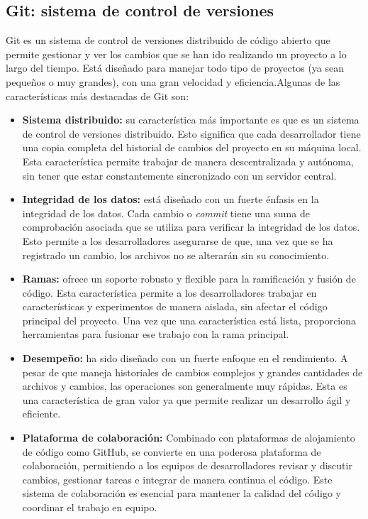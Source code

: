     \subsection{Git: sistema de control de versiones}
    Git \cite{wiki:git} es un sistema de control de versiones distribuido de código abierto que permite gestionar y ver los cambios que se han ido realizando un proyecto a lo largo del tiempo. Está diseñado para manejar todo tipo de proyectos (ya sean pequeños o muy grandes), con una gran velocidad y eficiencia.Algunas de las características más destacadas de Git son:
    \begin{itemize}
        \item \textbf{Sistema distribuido:} su característica más importante es que es un sistema de control de versiones distribuido. Esto significa que cada desarrollador tiene una copia completa del historial de cambios del proyecto en su máquina local. Esta característica permite trabajar de manera descentralizada y autónoma, sin tener que estar constantemente sincronizado con un servidor central.
        \item \textbf{Integridad de los datos:} está diseñado con un fuerte énfasis en la integridad de los datos. Cada cambio o \textit{commit} tiene una suma de comprobación asociada que se utiliza para verificar la integridad de los datos. Esto permite a los desarrolladores asegurarse de que, una vez que se ha registrado un cambio, los archivos no se alterarán sin su conocimiento.
        \item \textbf{Ramas:} ofrece un soporte robusto y flexible para la ramificación y fusión de código. Esta característica permite a los desarrolladores trabajar en características y experimentos de manera aislada, sin afectar el código principal del proyecto. Una vez que una característica está lista, proporciona herramientas para fusionar ese trabajo con la rama principal.
        \item \textbf{Desempeño:} ha sido diseñado con un fuerte enfoque en el rendimiento. A pesar de que maneja historiales de cambios complejos y grandes cantidades de archivos y cambios, las operaciones son generalmente muy rápidas. Esta es una característica de gran valor ya que permite realizar un desarrollo ágil y eficiente.
        \item \textbf{Plataforma de colaboración:} Combinado con plataformas de alojamiento de código como GitHub, se convierte en una poderosa plataforma de colaboración, permitiendo a los equipos de desarrolladores revisar y discutir cambios, gestionar tareas e integrar de manera continua el código. Este sistema de colaboración es esencial para mantener la calidad del código y coordinar el trabajo en equipo.
    \end{itemize}
        
